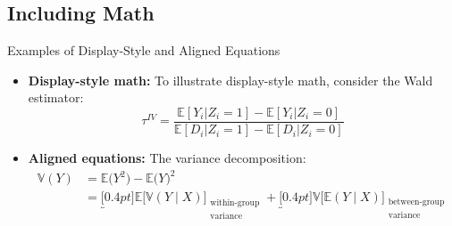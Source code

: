 
\subsection{Including Math}

\begin{frame}{Examples of Display-Style and Aligned Equations}

\begin{itemize}
\item \textbf{Display-style math:} To illustrate display-style math, consider the Wald estimator:
\[
\tau^{IV} = \frac{\mathbb{E}[Y_i | Z_i = 1] - \mathbb{E}[Y_i | Z_i = 0]}{\mathbb{E}[D_i | Z_i = 1] - \mathbb{E}[D_i | Z_i = 0]}
\]

\vfill\pause 

\item \textbf{Aligned equations:} The variance decomposition:
\begin{align*}
\mathbb{V}(Y) &= \mathbb{E}\big( Y^2  \big) -  \mathbb{E}\big( Y \big)^2 \\
&= \underbracket[0.4pt]{\mathbb{E}\big[\mathbb{V}(Y \mid X)\big]}_{\substack{\text{within-group} \\ \text{variance}}} + \underbracket[0.4pt]{\mathbb{V}\big[\mathbb{E}(Y \mid X)\big]}_{\substack{\text{between-group} \\ \text{variance}}}
\end{align*}
\end{itemize}

\end{frame}
